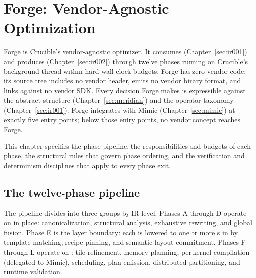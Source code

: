 
\section{Forge: Vendor-Agnostic Optimization}
\label{sec:forge}

Forge is Crucible's vendor-agnostic optimizer.
It consumes  (Chapter~\ref{sec:ir001}) and produces  (Chapter~\ref{sec:ir002}) through twelve phases running on Crucible's background thread within hard wall-clock budgets.
Forge has zero vendor code: its source tree includes no vendor header, emits no vendor binary format, and links against no vendor SDK.
Every decision Forge makes is expressible against the abstract  structure (Chapter~\ref{sec:meridian}) and the operator taxonomy (Chapter~\ref{sec:ir001}).
Forge integrates with Mimic (Chapter~\ref{sec:mimic}) at exactly five entry points; below those entry points, no vendor concept reaches Forge.

This chapter specifies the phase pipeline, the responsibilities and budgets of each phase, the structural rules that govern phase ordering, and the verification and determinism disciplines that apply to every phase exit.

\subsection{The twelve-phase pipeline}
\label{sec:forge-pipeline}

The pipeline divides into three groups by IR level.
Phases A through D operate on  in place: canonicalization, structural analysis, exhaustive rewriting, and global fusion.
Phase E is the layer boundary: each  is lowered to one or more s in  by template matching, recipe pinning, and semantic-layout commitment.
Phases F through L operate on : tile refinement, memory planning, per-kernel compilation (delegated to Mimic), scheduling, plan emission, distributed partitioning, and runtime validation.

